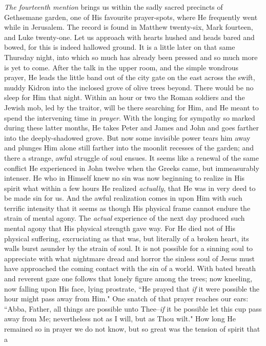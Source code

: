 \textit{The fourteenth mention} brings us within the sadly sacred precincts of
Gethsemane garden, one of His favourite prayer-spots, where He frequently
went while in Jerusalem. The record is found in Matthew twenty-six, Mark
fourteen, and Luke twenty-one. Let us approach with hearts hushed and
heads bared and bowed, for this is indeed hallowed ground. It is a little
later on that same Thursday night, into which so much has already been
pressed and so much more is yet to come. After the talk in the upper room,
and the simple wondrous prayer, He leads the little band out of the city
gate on the east across the swift, muddy Kidron into the inclosed grove of
olive trees beyond. There would be no sleep for Him that night. Within an
hour or two the Roman soldiers and the Jewish mob, led by the traitor,
will be there searching for Him, and He meant to spend the intervening
time in \textit{prayer}. With the longing for sympathy so marked during these
latter months, He takes Peter and James and John and goes farther into the
deeply-shadowed grove. But now some invisible power tears him away and
plunges Him alone still farther into the moonlit recesses of the garden;
and there a strange, awful struggle of soul ensues. It seems like a
renewal of the same conflict He experienced in John twelve when the Greeks
came, but immeasurably intenser. He who in Himself knew no sin was now
beginning to realize in His spirit what within a few hours He realized
\textit{actually}, that He was in very deed to be made sin for us. And the awful
realization comes in upon Him with such terrific intensity that it seems
as though His physical frame cannot endure the strain of mental agony. The
\textit{actual} experience of the next day produced such mental agony that His
physical strength gave way. For He died not of His physical suffering,
excruciating as that was, but literally of a broken heart, its walls burst
asunder by the strain of soul. It is not possible for a sinning soul to
appreciate with what nightmare dread and horror the sinless soul of Jesus
must have approached the coming contact with the sin of a world. With
bated breath and reverent gaze one follows that lonely figure among the
trees; now kneeling, now falling upon His face, lying prostrate, ``He
prayed that \textit{if} it were possible the hour might pass away from Him." One
snatch of that prayer reaches our ears: ``Abba, Father, all things are
possible unto Thee--\textit{if} it be possible let this cup pass away from Me;
nevertheless not as I will, but as Thou wilt." How long He remained so in
prayer we do not know, but so great was the tension of spirit that a
